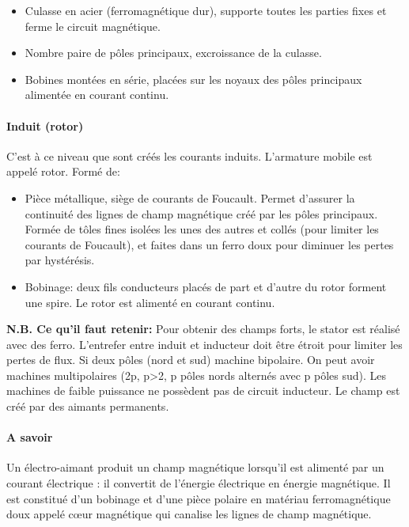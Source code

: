 \documentclass[11pt]{report}
\numberwithin{figure}{section}
\numberwithin{equation}{section}
\numberwithin{table}{section}
\newcommand{\1}{\boldsymbol{1}}
\begin{document}
\begin{itemize}
\item Culasse en acier (ferromagnétique dur), supporte toutes les parties fixes et ferme le circuit magnétique.

\item Nombre paire de pôles principaux, excroissance de la culasse.

\item Bobines montées en série, placées sur les noyaux des pôles principaux alimentée en courant continu.

\end{itemize}
 

\paragraph*{Induit (rotor)} C'est à ce niveau que sont créés les courants induits. L'armature mobile est appelé rotor. Formé de:

\begin{itemize}
\item Pièce métallique, siège de courants de Foucault. Permet d'assurer la continuité des lignes de champ magnétique créé par les pôles principaux. Formée de tôles fines isolées les unes des autres et collés (pour limiter les courants de Foucault), et faites dans un ferro doux pour diminuer les pertes par hystérésis. 

\item Bobinage: deux fils conducteurs placés de part et d'autre du rotor forment une spire. Le rotor est alimenté en courant continu.
\end{itemize}

\textbf{N.B. Ce qu'il faut retenir:} Pour obtenir des champs forts, le stator est réalisé avec des ferro. L'entrefer entre induit et inducteur doit être étroit pour limiter les pertes de flux. Si deux pôles (nord et sud) machine bipolaire. On peut avoir machines multipolaires (2p, p>2, p pôles nords alternés avec p pôles sud). Les  machines de faible puissance ne possèdent pas de circuit inducteur. Le champ est créé par des aimants permanents.

\paragraph{A savoir} Un électro-aimant produit un champ magnétique lorsqu'il est alimenté par un courant électrique : il convertit de l’énergie électrique en énergie magnétique. Il est constitué d’un bobinage et d’une pièce polaire en matériau ferromagnétique doux appelé cœur magnétique qui canalise les lignes de champ magnétique.
\end{document}
